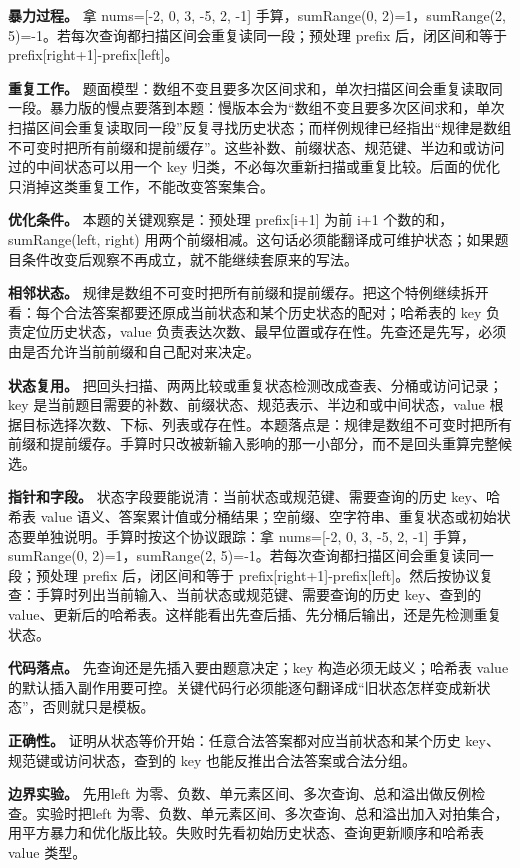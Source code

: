 \textbf{暴力过程。} 拿 nums=[-2, 0, 3, -5, 2, -1] 手算，sumRange(0, 2)=1，sumRange(2, 5)=-1。若每次查询都扫描区间会重复读同一段；预处理 prefix 后，闭区间和等于 prefix[right+1]-prefix[left]。

\textbf{重复工作。} 题面模型：数组不变且要多次区间求和，单次扫描区间会重复读取同一段。暴力版的慢点要落到本题：慢版本会为“数组不变且要多次区间求和，单次扫描区间会重复读取同一段”反复寻找历史状态；而样例规律已经指出“规律是数组不可变时把所有前缀和提前缓存”。这些补数、前缀状态、规范键、半边和或访问过的中间状态可以用一个 key 归类，不必每次重新扫描或重复比较。后面的优化只消掉这类重复工作，不能改变答案集合。

\textbf{优化条件。} 本题的关键观察是：预处理 prefix[i+1] 为前 i+1 个数的和，sumRange(left, right) 用两个前缀相减。这句话必须能翻译成可维护状态；如果题目条件改变后观察不再成立，就不能继续套原来的写法。

\textbf{相邻状态。} 规律是数组不可变时把所有前缀和提前缓存。把这个特例继续拆开看：每个合法答案都要还原成当前状态和某个历史状态的配对；哈希表的 key 负责定位历史状态，value 负责表达次数、最早位置或存在性。先查还是先写，必须由是否允许当前前缀和自己配对来决定。

\textbf{状态复用。} 把回头扫描、两两比较或重复状态检测改成查表、分桶或访问记录；key 是当前题目需要的补数、前缀状态、规范表示、半边和或中间状态，value 根据目标选择次数、下标、列表或存在性。本题落点是：规律是数组不可变时把所有前缀和提前缓存。手算时只改被新输入影响的那一小部分，而不是回头重算完整候选。

\textbf{指针和字段。} 状态字段要能说清：当前状态或规范键、需要查询的历史 key、哈希表 value 语义、答案累计值或分桶结果；空前缀、空字符串、重复状态或初始状态要单独说明。手算时按这个协议跟踪：拿 nums=[-2, 0, 3, -5, 2, -1] 手算，sumRange(0, 2)=1，sumRange(2, 5)=-1。若每次查询都扫描区间会重复读同一段；预处理 prefix 后，闭区间和等于 prefix[right+1]-prefix[left]。然后按协议复查：手算时列出当前输入、当前状态或规范键、需要查询的历史 key、查到的 value、更新后的哈希表。这样能看出先查后插、先分桶后输出，还是先检测重复状态。

\textbf{代码落点。} 先查询还是先插入要由题意决定；key 构造必须无歧义；哈希表 value 的默认插入副作用要可控。关键代码行必须能逐句翻译成“旧状态怎样变成新状态”，否则就只是模板。

\textbf{正确性。} 证明从状态等价开始：任意合法答案都对应当前状态和某个历史 key、规范键或访问状态，查到的 key 也能反推出合法答案或合法分组。

\textbf{边界实验。} 先用left 为零、负数、单元素区间、多次查询、总和溢出做反例检查。实验时把left 为零、负数、单元素区间、多次查询、总和溢出加入对拍集合，用平方暴力和优化版比较。失败时先看初始历史状态、查询更新顺序和哈希表 value 类型。

